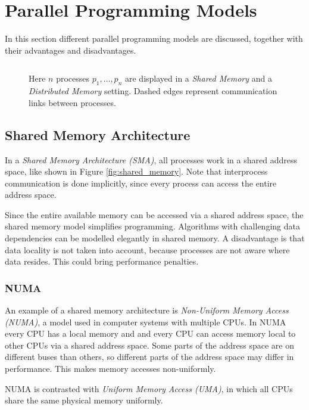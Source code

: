 \chapter{Parallel Programming Models}
In this section different parallel programming models are discussed, together with their advantages and disadvantages.

\begin{figure}
	\centering
	$\hspace{36pt}$

	\caption{Here $n$ processes $p_1, \dots, p_n$ are displayed in a \emph{Shared Memory} and a \emph{Distributed Memory} setting. Dashed edges represent communication links between processes.}
	\label{fig:shared_distributed_memory}
\end{figure}

\section{Shared Memory Architecture}
In a \emph{Shared Memory Architecture (SMA)}, all processes work in a shared address space, like shown in Figure \ref{fig:shared_memory}. Note that interprocess communication is done implicitly, since every process can access the entire address space.

Since the entire available memory can be accessed via a shared address space, the shared memory model simplifies programming. Algorithms with challenging data dependencies can be modelled elegantly in shared memory. A disadvantage is that data locality is not taken into account, because processes are not aware where data resides. This could bring performance penalties.

\subsection{NUMA}
An example of a shared memory architecture is \emph{Non-Uniform Memory Access (NUMA)}, a model used in computer systems with multiple CPUs. In NUMA every CPU has a local memory and and every CPU can access memory local to other CPUs via a shared address space. Some parts of the address space are on different buses than others, so different parts of the address space may differ in performance. This makes memory accesses non-uniformly.

NUMA is contrasted with \emph{Uniform Memory Access (UMA)}, in which all CPUs share the same physical memory uniformly.

